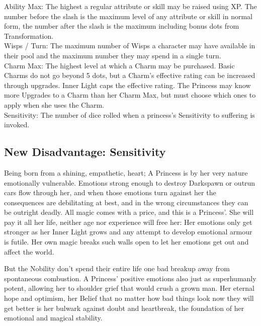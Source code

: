 \noindent Ability Max: The highest a regular attribute or skill may be raised using XP. The number before the slash is the maximum level of any attribute or skill in normal form, the number after the slash is the maximum including bonus dots from Transformation.\\

\noindent Wisps / Turn: The maximum number of Wisps a character may have available in their pool and the maximum number they may spend in a single turn.\\

\noindent Charm Max: The highest level at which a Charm may be purchased. Basic Charms do not go beyond 5 dots, but a Charm's effective rating can be increased through upgrades. Inner Light caps the effective rating. The Princess may know more Upgrades to a Charm than her Charm Max, but must choose which ones to apply when she uses the Charm.\\

\noindent Sensitivity: The number of dice rolled when a princess's Sensitivity to suffering is invoked. \\

\subsection*{New Disadvantage: Sensitivity}

Being born from a shining, empathetic, heart; A Princess is‭ ‬by her very nature‭ emotionally ‬vulnerable. Emotions strong enough to destroy Darkspawn or outrun cars flow through her, and when those emotions turn against her the consequences are debilitating‭ at best, and in the wrong circumstances they can be outright deadly. All magic comes with a price, and this is a Princess'. She will pay it all her life, neither age nor experience will free her: Her emotions only get stronger as her Inner Light grows and any attempt to develop emotional armour is futile. Her own magic breaks such walls open to let her emotions get out and affect the world.

But the Nobility don't spend their entire life one bad breakup away from spontaneous combustion. A Princess' positive emotions also just as superhumanly potent, allowing her to shoulder grief that would crush a grown man. Her eternal hope and optimism, her Belief that no matter how bad things look now they will get better is her bulwark against doubt and heartbreak, the foundation of her emotional and magical stability. 

